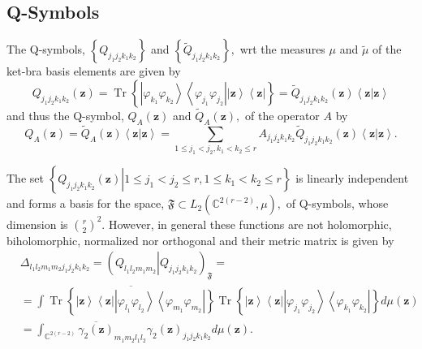 \documentclass[aps,preprint]{revtex4}%
\begin{document}
\subsection{Q-Symbols}

The Q-symbols, $\left\{  Q_{j_{1}j_{2}k_{1}k_{2}}\right\}  $ and $\left\{
\tilde{Q}_{j_{1}j_{2}k_{1}k_{2}}\right\}  ,$ wrt the measures $\mu$ and
$\tilde{\mu}$ of the ket-bra basis elements are given by
\begin{equation}
Q_{j_{1}j_{2}k_{1}k_{2}}\left(  \mathbf{z}\right)  =\operatorname*{Tr}\left\{
\left\vert \varphi_{k_{1}}\varphi_{k_{2}}\right\rangle \left\langle
\varphi_{j_{1}}\varphi_{j_{2}}\right\vert \left\vert \mathbf{z}\right\rangle
\left\langle \mathbf{z}\right\vert \right\}  =\tilde{Q}_{j_{1}j_{2}k_{1}k_{2}%
}\left(  \mathbf{z}\right)  \left\langle \mathbf{z}\left\vert \mathbf{z}%
\right.  \right\rangle
\end{equation}
and thus the Q-symbol, $Q_{A}\left(  \mathbf{z}\right)  $ and $\tilde{Q}%
_{A}\left(  \mathbf{z}\right)  ,$ of the operator $A$ by
\begin{equation}
Q_{A}\left(  \mathbf{z}\right)  =\tilde{Q}_{A}\left(  \mathbf{z}\right)
\left\langle \mathbf{z}\left\vert \mathbf{z}\right.  \right\rangle
=\sum_{1\leq j_{1}<j_{2},k_{1}<k_{2}\leq r}A_{j_{1}j_{2}k_{1}k_{2}}\tilde
{Q}_{j_{1}j_{2}k_{1}k_{2}}\left(  \mathbf{z}\right)  \left\langle
\mathbf{z}\left\vert \mathbf{z}\right.  \right\rangle .
\end{equation}


The set $\left\{  \left.  Q_{j_{1}j_{2}k_{1}k_{2}}\left(  \mathbf{z}\right)
\right\vert 1\leq j_{1}<j_{2}\leq r,1\leq k_{1}<k_{2}\leq r\right\}  $ is
linearly independent and forms a basis for the space, $\mathfrak{F}\subset
L_{2}\left(  \mathbb{C}^{2\left(  r-2\right)  },\mu\right)  ,$ of Q-symbols,
whose dimension is $\binom{r}{2}^{2}$. However, in general these functions are
not holomorphic, biholomorphic, normalized nor orthogonal and their metric
matrix is given by
\begin{align}
&  \Delta_{l_{1}l_{2}m_{1}m_{2}j_{1}j_{2}k_{1}k_{2}}=\left(  Q_{l_{1}%
l_{2}m_{1}m_{2}}\left\vert Q_{j_{1}j_{2}k_{1}k_{2}}\right.  \right)
_{\mathfrak{F}}=\nonumber\\
&  =\int\overline{\operatorname*{Tr}\left\{  \left\vert \mathbf{z}%
\right\rangle \left\langle \mathbf{z}\right\vert \left\vert \varphi_{l_{1}%
}\varphi_{l_{2}}\right\rangle \left\langle \varphi_{m_{1}}\varphi_{m_{2}%
}\right\vert \right\}  }\operatorname*{Tr}\left\{  \left\vert \mathbf{z}%
\right\rangle \left\langle \mathbf{z}\right\vert \left\vert \varphi_{j_{1}%
}\varphi_{j_{2}}\right\rangle \left\langle \varphi_{k_{1}}\varphi_{k_{2}%
}\right\vert \right\}  d\mu\left(  \mathbf{z}\right) \nonumber\\
&  =\int_{\mathbb{C}^{2\left(  r-2\right)  }}\overline{\gamma_{2}\left(
\mathbf{z}\right)  }_{m_{1}m_{2}l_{1}l_{2}}\gamma_{2}\left(  \mathbf{z}%
\right)  _{j_{1}j_{2}k_{1}k_{2}}d\mu\left(  \mathbf{z}\right)  .
\end{align}
\end{document}
